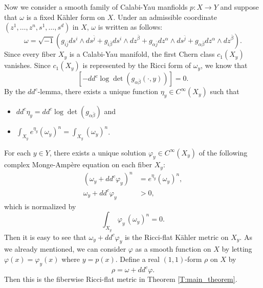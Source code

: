 \documentclass{amsart}
\theoremstyle{definition}
\numberwithin{equation}{section}
\begin{document}
Now we consider a smooth family of Calabi-Yau manfiolds $p:X\rightarrow Y$ and suppose that $\omega$ is a fixed K\"ahler form on $X$. Under an admissible coordinate $(z^1,\dots,z^n,s^1,\dots,s^d)$ in $X$, $\omega$ is written as follows:
\begin{equation*}
\omega
=
{\sqrt{-1}}{\left({g_{i\bar j}ds^i\wedge ds^{\bar j}
+g_{i\bar\beta}ds^i\wedge{dz}^{\bar\beta} 
+g_{\alpha\bar j}dz^\alpha\wedge ds^{\bar j}
+g_{\alpha\bar\beta}dz^\alpha\wedge{dz}^{\bar\beta}
}\right)}.
\end{equation*}
Since every fiber $X_y$ is a Calabi-Yau manifold, the first Chern class $c_1(X_y)$ vanishes. Since $c_1(X_y)$ is represented by the Ricci form of $\omega_y$, we know that 
\begin{equation*}
\left[
	-dd^c\log\det(g_{\alpha\bar\beta}(\cdot,y))
\right]
=0.
\end{equation*}
By the $dd^c$-lemma, there exists a unique function $\eta_y\in C^\infty(X_y)$ such that
\begin{itemize}
\item $dd^c\eta_y=dd^c\log\det(g_{\alpha\bar\beta})$ and
\item $\int_{X_y} e^{\eta_y}(\omega_y)^n=\int_{X_y}(\omega_y)^n$.
\end{itemize}
For each $y\in Y$, there exists a unique solution ${\varphi}_y\in C^\infty(X_y)$ of the following complex Monge-Amp\`ere equation on each fiber $X_y$:
\begin{equation}
\begin{aligned}
{\left({\omega_y+dd^c\varphi_y}\right)}^n
&=
e^{\eta_y}(\omega_y)^n, \\
\omega_y+dd^c\varphi_y
&>
0,
\end{aligned}
\end{equation}
which is normalized by
\begin{equation*}
\int_{X_y}{\varphi}_y\,(\omega_y)^n=0.
\end{equation*}
Then it is easy to see that $\omega_y+dd^c\varphi_y$ is the Ricci-flat K\"ahler metric on $X_y$. As we already mentioned, we can consider ${\varphi}$ as a smooth function on $X$ by letting ${\varphi}(x)={\varphi}_y(x)$ where $y=p(x)$. Define a real $(1,1)$-form $\rho$ on $X$ by
\begin{equation*}
\rho=\omega+dd^c{\varphi}.
\end{equation*}
Then this is the fiberwise Ricci-flat metric in Theorem \ref{T:main_theorem}. 
\medskip
\end{document}
